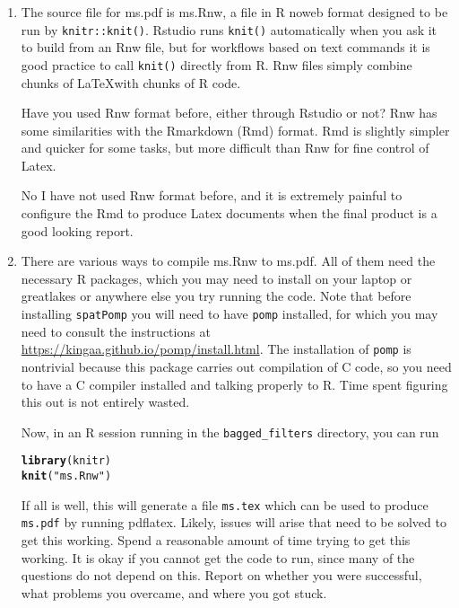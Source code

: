\documentclass[12pt]{article}\usepackage[]{graphicx}\usepackage[]{color}
\makeatletter
\newcommand{\hlstr}[1]{\textcolor[rgb]{0.192,0.494,0.8}{#1}}%
\newcommand{\hlstd}[1]{\textcolor[rgb]{0.345,0.345,0.345}{#1}}%
\newcommand{\hlkwd}[1]{\textcolor[rgb]{0.737,0.353,0.396}{\textbf{#1}}}%
\newenvironment{kframe}{%
 \def\at@end@of@kframe{}%
 \ifinner\ifhmode%
  \def\at@end@of@kframe{\end{minipage}}%
  \begin{minipage}{\columnwidth}%
 \fi\fi%
 \def\FrameCommand##1{\hskip\@totalleftmargin \hskip-\fboxsep
 \colorbox{shadecolor}{##1}\hskip-\fboxsep
     \hskip-\linewidth \hskip-\@totalleftmargin \hskip\columnwidth}%
 \MakeFramed {\advance\hsize-\width
   \@totalleftmargin\z@ \linewidth\hsize
   \@setminipage}}%
 {\par\unskip\endMakeFramed%
 \at@end@of@kframe}
\newenvironment{knitrout}{}{} %
\makeatother
\begin{document}
\begin{enumerate}

\item The source file for ms.pdf is ms.Rnw, a file in R noweb format designed to be run by \texttt{knitr::knit()}. Rstudio runs \texttt{knit()} automatically when you ask it to build from an Rnw file, but for workflows based on text commands it is good practice to call \texttt{knit()} directly from R. Rnw files simply combine chunks of \LaTeX with chunks of R code.

Have you used Rnw format before, either through Rstudio or not? Rnw has some similarities with the Rmarkdown (Rmd) format. Rmd is slightly simpler and quicker for some tasks, but more difficult than Rnw for fine control of Latex.

No I have not used Rnw format before, and it is extremely painful to configure the Rmd to produce Latex documents when the final product is a good looking report.

\item There are various ways to compile ms.Rnw to ms.pdf. All of them need the necessary R packages, which you may need to install on your laptop or greatlakes or anywhere else you try running the code.
Note that before installing \texttt{spatPomp} you will need to have \texttt{pomp} installed, for which you may need to consult the instructions at \url{https://kingaa.github.io/pomp/install.html}.
The installation of \texttt{pomp} is nontrivial because this package carries out compilation of C code, so you need to have a C compiler installed and talking properly to R. Time spent figuring this out is not entirely wasted. 

Now, in an R session running in the \texttt{bagged\_filters} directory, you can run
\begin{knitrout}
\color{fgcolor}\begin{kframe}
\begin{alltt}
\hlkwd{library}\hlstd{(knitr)}
\hlkwd{knit}\hlstd{(}\hlstr{"ms.Rnw"}\hlstd{)}
\end{alltt}
\end{kframe}
\end{knitrout}
If all is well, this will generate a file \texttt{ms.tex} which can be used to produce \texttt{ms.pdf} by running pdflatex. Likely, issues will arise that need to be solved to get this working. Spend a reasonable amount of time trying to get this working. It is okay if you cannot get the code to run, since many of the questions do not depend on this. Report on whether you were successful, what problems you overcame, and where you got stuck.


\end{enumerate}
\end{document}

